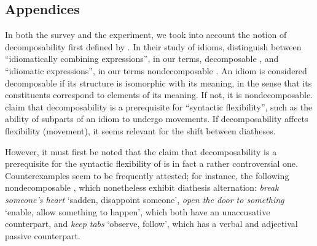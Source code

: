 \documentclass[output=paper]{langsci/langscibook}
\begin{document}
\begin{subappendices}

\section*{Appendices}

In both the survey and the experiment, we took into account the notion of
decomposability first defined by \textcite{NunSagWas1994}. In their study of
idioms, \citeauthor{NunSagWas1994} distinguish between ``idiomatically combining
expressions'', in our terms, decomposable , and ``idiomatic expressions'',
in our terms nondecomposable . An idiom is considered decomposable if its
structure is isomorphic with its meaning, in the sense that its constituents
correspond to elements of its meaning. If not, it is nondecomposable.
\textcite{NunSagWas1994} claim that decomposability is a prerequisite for
``syntactic flexibility'', such as the ability of subparts of an idiom to
undergo movements.  If decomposability affects flexibility (movement), it seems
relevant for the shift between diatheses.

However, it must first be noted that the claim that decomposability is a
prerequisite for the syntactic flexibility of  is in fact a rather
controversial one. Counterexamples seem to be frequently attested; for
instance, the following nondecomposable , which nonetheless exhibit
diathesis alternation: \emph{break someone’s heart} ‘sadden, disappoint
someone’, \emph{open the door to something} ‘enable, allow something to
happen', which both have an unaccusative counterpart, and \emph{keep tabs}
‘observe, follow’, which has a verbal and adjectival passive
counterpart.


\end{subappendices}
\end{document}
